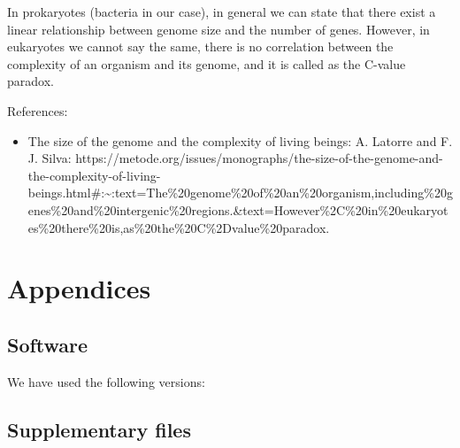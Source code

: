 \documentclass[10pt,a4paper,]{article}
\newenvironment{Shaded}{}{}
\newcommand{\CommentTok}[1]{\textcolor[rgb]{0.38,0.63,0.69}{\textit{#1}}}
\newcommand{\ExtensionTok}[1]{#1}
\newcommand{\FunctionTok}[1]{\textcolor[rgb]{0.02,0.16,0.49}{#1}}
\newcommand{\NormalTok}[1]{#1}
\providecommand{\tightlist}{%
  \setlength{\itemsep}{0pt}\setlength{\parskip}{0pt}}
\begin{document}
In prokaryotes (bacteria in our case), in general we can state that
there exist a linear relationship between genome size and the number of
genes. However, in eukaryotes we cannot say the same, there is no
correlation between the complexity of an organism and its genome, and it
is called as the C-value paradox.

References:

\begin{itemize}
\tightlist
\item
  The size of the genome and the complexity of living beings: A. Latorre
  and F. J. Silva:
  https://metode.org/issues/monographs/the-size-of-the-genome-and-the-complexity-of-living-beings.html\#:\textasciitilde{}:text=The\%20genome\%20of\%20an\%20organism,including\%20genes\%20and\%20intergenic\%20regions.\&text=However\%2C\%20in\%20eukaryotes\%20there\%20is,as\%20the\%20C\%2Dvalue\%20paradox.
\end{itemize}

\clearpage

\hypertarget{appendices}{%
\section{Appendices}\label{appendices}}

\label{sec:appendices}

\hypertarget{software}{%
\subsection{Software}\label{software}}

We have used the following versions:

\begin{Shaded}
\end{Shaded}

\hypertarget{supplementary-files}{%
\subsection{Supplementary files}\label{supplementary-files}}
\end{document}
